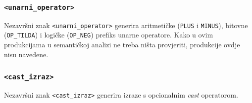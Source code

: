 \documentclass[times, 12pt, utf8]{book}
\begin{document}
\subsubsection{\texttt{<unarni\_operator>}}

Nezavršni znak \verb|<unarni_operator>| generira aritmetičke (\verb|PLUS| i \verb|MINUS|), bitovne (\verb|OP_TILDA|) i logičke (\verb|OP_NEG|) prefiks unarne operatore.
Kako u ovim produkcijama u semantičkoj analizi ne treba ništa provjeriti, produkcije ovdje nisu navedene.

\subsubsection{\texttt{<cast\_izraz>}}

Nezavršni znak \verb|<cast_izraz>| generira izraze s opcionalnim \emph{cast} operatorom.
\end{document}
